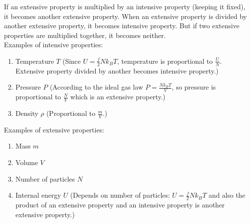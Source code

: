 If an extensive property is multiplied by an intensive property (keeping it fixed), it becomes another extensive property. When an extensive property is divided by another extensive property, it becomes intensive property. But if two extensive properties are multiplied together, it becomes neither. \\

Examples of intensive properties:

\begin{enumerate}
	\item Temperature $T$ (Since $U=\frac{f}{2}Nk_BT$, temperature is proportional to $\frac{U}{N}$. Extensive property divided by another becomes intensive property.)
	\item Pressure $P$ (According to the ideal gas law $P=\frac{Nk_BT}{V}$, so pressure is proportional to $\frac{N}{V}$ which is an extensive property.)
	\item Density $\rho$ (Proportional to $\frac{m}{V}$.)
\end{enumerate}

Examples of extensive properties:

\begin{enumerate}
	\item Mass $m$
	\item Volume $V$
	\item Number of particles $N$
	\item Internal energy $U$ (Depends on number of particles: $U=\frac{f}{2}Nk_BT$ and also the product of an extensive property and an intensive property is another extensive property.)
\end{enumerate}

